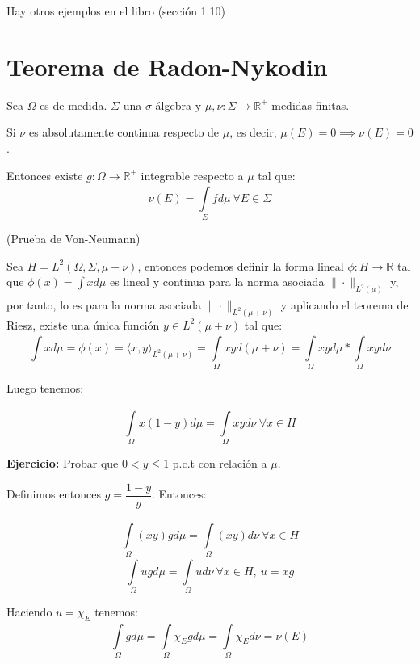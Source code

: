 \documentclass[openany]{book}
\begin{document}
Hay otros ejemplos en el libro (sección 1.10)

\section{Teorema de Radon-Nykodin}

\begin{theorem}
    Sea $ \Omega  $ es de medida. $ \Sigma$ una $ \sigma$-álgebra y $ \mu,\nu: \Sigma \to \mathbb{R}^{+}$ medidas finitas.

    Si $ \nu$ es absolutamente continua respecto de $ \mu$, es decir, $ \mu(E) = 0 \implies \nu(E) = 0$.

    Entonces existe $ g:\Omega  \to \mathbb{R}^{+}$ integrable respecto a $ \mu$ tal que:
    $$ \nu(E) = \int\limits_{E}^{}f d\mu \ \forall E \in \Sigma $$
\end{theorem}

\begin{demonstration}
    (Prueba de Von-Neumann)
    

    Sea $ H = L^2(\Omega ,\Sigma, \mu + \nu)$, entonces podemos definir la forma lineal $ \phi: H \to \mathbb{R}$ tal que $ \phi(x) = \int\limits_{}^{}xd\mu$ es lineal y continua para la norma asociada $ \|\cdot \|_{L^2(\mu)}$ y, por tanto, lo es para la norma asociada $ \|\cdot \|_{L^2(\mu+\nu)}   $ y aplicando el teorema de Riesz, existe una única función $ y \in L^2(\mu+\nu)$ tal que:
    $$ \int\limits_{}^{} x d\mu = \phi(x) = \langle x, y \rangle_{L^2(\mu+\nu)} = \int\limits_{\Omega }^{} xy d(\mu+\nu) = \int\limits_{\Omega }^{}xy d\mu * \int\limits_{\Omega }^{}xy d\nu $$

    Luego tenemos:

    $$ \int\limits_{\Omega }^{}x(1-y)d\mu = \int\limits_{\Omega }^{}xy d\nu \ \forall x \in H $$

    \textbf{Ejercicio:} Probar que $ 0<y\leq 1$ p.c.t con relación a $ \mu$.

    Definimos entonces $ g=\dfrac{1-y}{y}$. Entonces:

    $$ \int\limits_{\Omega }^{} (xy)g d\mu = \int\limits_{\Omega }^{}(xy)d \nu \ \forall x \in H $$
    $$ \int\limits_{\Omega }^{}u g d\mu = \int\limits_{\Omega }^{}u d\nu \ \forall x \in H,\ u=xg $$

    Haciendo $ u = \chi_{E}$ tenemos:
    $$ \int\limits_{\Omega }^{} g d\mu = \int\limits_{\Omega }^{} \chi_{E} g d\mu = \int\limits_{\Omega }^{}\chi_{E}d \nu = \nu(E) $$

\end{demonstration}
\end{document}
